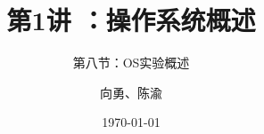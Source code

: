 


\title[第1讲]{第1讲 ：操作系统概述} %
\subtitle{第八节：OS实验概述}
\author{向勇、陈渝} %
\date{\today} %



\begin{frame}
\titlepage %
\end{frame}

%
%



